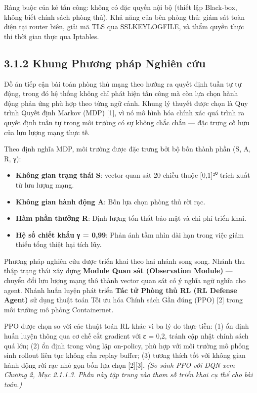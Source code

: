 \documentclass[12pt,a4paper,twoside]{report}
\begin{document}
{Ràng buộc của kẻ tấn công: không có đặc quyền nội bộ (thiết lập Black-box, không biết chính sách phòng thủ). Khả năng của bên phòng thủ: giám sát toàn diện tại router biên, giải mã TLS qua SSLKEYLOGFILE, và thẩm quyền thực thi thời gian thực qua Iptables.

\subsection{3.1.2 Khung Phương pháp Nghiên cứu}

Đồ án tiếp cận bài toán phòng thủ mạng theo hướng ra quyết định tuần tự tự động, trong đó hệ thống không chỉ phát hiện tấn công mà còn lựa chọn hành động phản ứng phù hợp theo từng ngữ cảnh. Khung lý thuyết được chọn là Quy trình Quyết định Markov (MDP) [1], vì nó mô hình hóa chính xác quá trình ra quyết định tuần tự trong môi trường có sự không chắc chắn — đặc trưng cố hữu của lưu lượng mạng thực tế.

Theo định nghĩa MDP, môi trường được đặc trưng bởi bộ bốn thành phần (S, A, R, γ):
\begin{itemize}
\item \textbf{Không gian trạng thái S}: vector quan sát 20 chiều thuộc [0,1]²⁰ trích xuất từ lưu lượng mạng.
\item \textbf{Không gian hành động A}: Bốn lựa chọn phòng thủ rời rạc.
\item \textbf{Hàm phần thưởng R}: Định lượng tổn thất bảo mật và chi phí triển khai.
\item \textbf{Hệ số chiết khấu γ = 0,99}: Phản ánh tầm nhìn dài hạn trong việc giảm thiểu tổng thiệt hại tích lũy.
\end{itemize}

Phương pháp nghiên cứu được triển khai theo hai nhánh song song. Nhánh thu thập trạng thái xây dựng \textbf{Module Quan sát (Observation Module)} — chuyển đổi lưu lượng mạng thô thành vector quan sát có ý nghĩa ngữ nghĩa cho agent. Nhánh huấn luyện phát triển \textbf{Tác tử Phòng thủ RL (RL Defense Agent)} sử dụng thuật toán Tối ưu hóa Chính sách Gần đúng (PPO) [2] trong môi trường mô phỏng Containernet.

PPO được chọn so với các thuật toán RL khác vì ba lý do thực tiễn: (1) ổn định huấn luyện thông qua cơ chế cắt gradient với ε = 0,2, tránh cập nhật chính sách quá lớn; (2) ổn định trong vòng lặp on-policy, phù hợp với môi trường mô phỏng sinh rollout liên tục không cần replay buffer; (3) tương thích tốt với không gian hành động rời rạc nhỏ gọn bốn lựa chọn [2][3]. \textit{(So sánh PPO với DQN xem Chương 2, Mục 2.1.1.3. Phần này tập trung vào tham số triển khai cụ thể cho bài toán.)}

}
\end{document}
